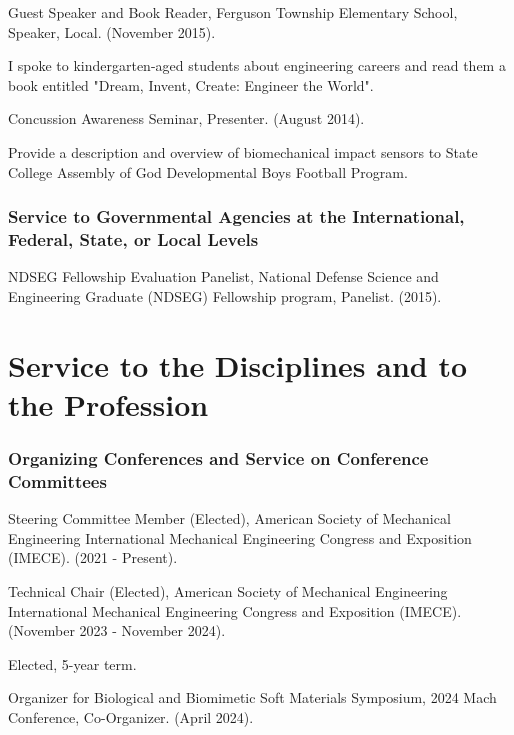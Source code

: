 \documentclass[a4paper,10pt]{article}
\begin{document}
\hspace{1cm}Guest Speaker and Book Reader, Ferguson Township Elementary School, Speaker, Local. (November 2015).

\hspace{1cm}I spoke to kindergarten-aged students about engineering careers and read them a book entitled "Dream, Invent, Create: Engineer the World".

\hspace{1cm}Concussion Awareness Seminar, Presenter. (August 2014).

\hspace{1cm}Provide a description and overview of biomechanical impact sensors to State College Assembly of God Developmental Boys Football Program.

\subsubsection*{Service to Governmental Agencies at the International, Federal, State, or Local Levels}

\hspace{1cm}NDSEG Fellowship Evaluation Panelist, National Defense Science and Engineering Graduate (NDSEG) Fellowship program, Panelist. (2015).
\section*{Service to the Disciplines and to the Profession}

\subsubsection*{Organizing Conferences and Service on Conference Committees}

\hspace{1cm}Steering Committee Member (Elected), American Society of Mechanical Engineering International Mechanical Engineering Congress and Exposition (IMECE). (2021 - Present).

\hspace{1cm}Technical Chair (Elected), American Society of Mechanical Engineering International Mechanical Engineering Congress and Exposition (IMECE). (November 2023 - November 2024).

\hspace{1cm}Elected, 5-year term.

\hspace{1cm}Organizer for Biological and Biomimetic Soft Materials Symposium, 2024 Mach Conference, Co-Organizer. (April 2024).
\end{document}

